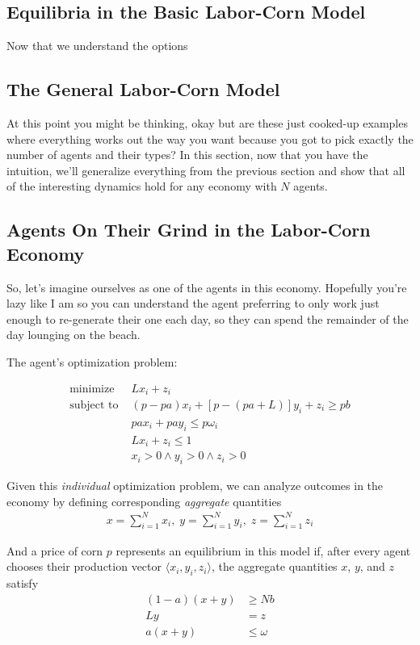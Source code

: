 \subsection{Equilibria in the Basic Labor-Corn Model}

Now that we understand the options

\subsection{The General Labor-Corn Model}

At this point you might be thinking, okay but are these just cooked-up examples where everything works out the way you want because you got to pick exactly the number of agents and their types? In this section, now that you have the intuition, we'll generalize everything from the previous section and show that all of the interesting dynamics hold for any economy with $N$ agents.

\subsection{Agents On Their Grind in the Labor-Corn Economy}

So, let's imagine ourselves as one of the agents in this economy. Hopefully you're lazy like I am so you can understand the agent preferring to only work just enough to re-generate their one \Corn{} each day, so they can spend the remainder of the day lounging on the beach.

The agent's optimization problem:

\begin{align}
	\text{minimize } & Lx_i + z_i \\
	\text{subject to } & (p-pa)x_i + [p - (pa + L)]y_i + z_i \geq pb \\
	& pax_i + pay_i \leq p\omega_i \\
	& Lx_i + z_i \leq 1 \\
	& x_i > 0 \wedge y_i > 0 \wedge z_i > 0
\end{align}

Given this \textit{individual} optimization problem, we can analyze outcomes in the economy by defining corresponding \textit{aggregate} quantities
\begin{align*}
	x = \sum_{i=1}^N x_i, \; y = \sum_{i=1}^N y_i, \; z = \sum_{i=1}^N z_i
\end{align*}

And a price of corn $p$ represents an equilibrium in this model if, after every agent chooses their production vector $\langle x_i, y_i, z_i\rangle$, the aggregate quantities $x$, $y$, and $z$ satisfy
\begin{align}
	(1-a)(x+y) &\geq Nb \\
	Ly &= z \\
	a(x + y) &\leq \omega
\end{align}

